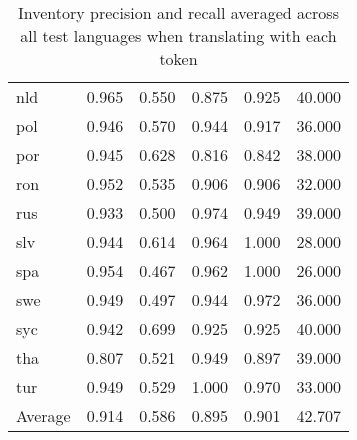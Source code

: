 \begin{table}[h]
\begin{tabular}{lrr|rr|r}
nld        &             0.965 &               0.550 &          0.875 &            0.925 &                      40.000 \\
pol        &             0.946 &               0.570 &          0.944 &            0.917 &                      36.000 \\
por        &             0.945 &               0.628 &          0.816 &            0.842 &                      38.000 \\
ron        &             0.952 &               0.535 &          0.906 &            0.906 &                      32.000 \\
rus        &             0.933 &               0.500 &          0.974 &            0.949 &                      39.000 \\
slv        &             0.944 &               0.614 &          0.964 &            1.000 &                      28.000 \\
spa        &             0.954 &               0.467 &          0.962 &            1.000 &                      26.000 \\
swe        &             0.949 &               0.497 &          0.944 &            0.972 &                      36.000 \\
syc        &             0.942 &               0.699 &          0.925 &            0.925 &                      40.000 \\
tha        &             0.807 &               0.521 &          0.949 &            0.897 &                      39.000 \\
tur        &             0.949 &               0.529 &          1.000 &            0.970 &                      33.000 \\
\midrule
Average    &             0.914 &               0.586 &          0.895 &            0.901 &                      42.707 \\
\bottomrule
\end{tabular}
\caption{Inventory precision and recall averaged across all test languages when translating with each token}
\label{table:inventory}
\end{table}
